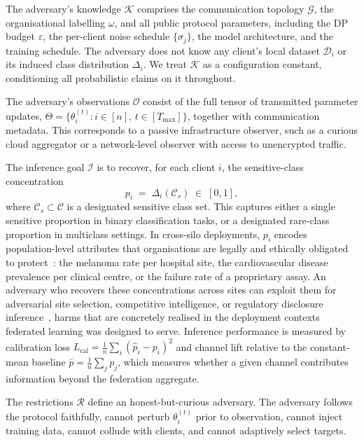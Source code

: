 \documentclass[letterpaper,journal]{IEEEtran}
\begin{document}
The adversary's knowledge $\mathcal{K}$ comprises the communication
topology $\mathcal{G}$, the organisational labelling $\omega$, and
all public protocol parameters, including the DP budget
$\varepsilon$, the per-client noise schedule $\{\sigma_j\}$, the
model architecture, and the training schedule. The adversary does
not know any client's local dataset $\mathcal{D}_i$ or its induced
class distribution $\Delta_i$. We treat $\mathcal{K}$ as a
configuration constant, conditioning all probabilistic claims on it
throughout.

The adversary's observations $\mathcal{O}$ consist of the full
tensor of transmitted parameter updates, $\Theta =
\{\theta_i^{(t)} : i \in [n],\, t \in [T_{\max}]\}$, together with
communication metadata. This corresponds to a passive infrastructure
observer, such as a curious cloud aggregator or a network-level
observer with access to unencrypted traffic.

The inference goal $\mathcal{I}$ is to recover, for each client $i$,
the sensitive-class concentration
\[
p_i \;=\; \Delta_i(\mathcal{C}_s) \;\in\; [0,1],
\]
where $\mathcal{C}_s \subset \mathcal{C}$ is a designated sensitive
class set. This captures either a single sensitive proportion in
binary classification tasks, or a designated rare-class proportion
in multiclass settings. In cross-silo deployments, $p_i$ encodes
population-level attributes that organisations are legally and
ethically obligated to
protect~\cite{sheller2020medicine,dayan2021covid}: the melanoma rate
per hospital site, the cardiovascular disease prevalence per clinical
centre, or the failure rate of a proprietary assay. An adversary who
recovers these concentrations across sites can exploit them for
adversarial site selection, competitive intelligence, or regulatory
disclosure inference~\cite{hu2021source}, harms that are concretely
realised in the deployment contexts federated learning was designed
to serve. Inference performance is measured by calibration loss
$L_{\text{cal}} = \frac{1}{n}\sum_i (\hat{p}_i - p_i)^2$ and
channel lift relative to the constant-mean baseline $\bar{p} =
\frac{1}{n}\sum_j p_j$, which measures whether a given channel
contributes information beyond the federation aggregate.

The restrictions $\mathcal{R}$ define an honest-but-curious
adversary. The adversary follows the protocol faithfully, cannot
perturb $\theta_i^{(t)}$ prior to observation, cannot inject
training data, cannot collude with clients, and cannot adaptively
select targets.
\end{document}
